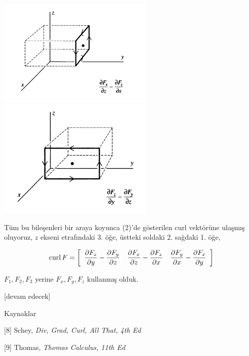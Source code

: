 \documentclass[12pt,fleqn]{article}\usepackage{../../common}
\begin{document}
\includegraphics[width=20em]{calc_multi_70_div_curl_lap_09.png}
\includegraphics[width=20em]{calc_multi_70_div_curl_lap_10.png}

Tüm bu bileşenleri bir araya koyunca (2)'de gösterilen curl vektörüne ulaşmış
oluyoruz, $z$ ekseni etrafındaki 3. öğe, üstteki soldaki 2. sağdaki 1. öğe,

$$
\operatorname{curl} F = \left[\begin{array}{ccc} 
\dfrac{\partial F_z}{\partial y} - \dfrac{\partial F_y}{\partial z} & 
\dfrac{\partial F_x}{\partial z} - \dfrac{\partial F_z}{\partial x} & 
\dfrac{\partial F_y}{\partial x} - \dfrac{\partial F_x}{\partial y} 
\end{array}\right]
$$

$F_1,F_2,F_3$ yerine $F_x,F_y,F_z$ kullanmış olduk.

[devam edecek]

Kaynaklar

[8] Schey, {\em Div, Grad, Curl, All That, 4th Ed}

[9] Thomas, {\em Thomas Calculus, 11th Ed}
\end{document}
